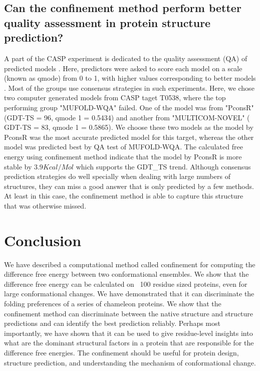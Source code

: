 \documentclass[12pt]{article}
\begin{document}
\subsection*{Can the confinement method perform better quality assessment in protein structure prediction?}

A part of the CASP experiment is dedicated to the quality assessment (QA) of predicted models \cite{Kryshtafovych2011}.
Here, predictors were asked to score each model on a scale (known as qmode) from 0 to 1, with higher values
corresponding to better models \cite{Kryshtafovych2011}. Most of the groups use consensus strategies in such experiments.
Here, we chose two computer generated models from CASP taget T0538, where the top performing group "MUFOLD-WQA" \cite{Wang2011} failed.
One of the model was from "PconsR" (GDT-TS = 96, qmode 1 = 0.5434) and another from "MULTICOM-NOVEL" ( GDT-TS = 83, qmode 1 = 0.5865). We 
choose these two models as the model by PconsR was the most accurate
predicted model for this target, whereas the other model was predicted best by QA test of MUFOLD-WQA. The calculated
free energy using confinement method indicate that the model by PconsR is more stable by $3.9
Kcal/Mol$ which supports
the GDT\_TS trend.  Although consensus prediction strategies do well specially when dealing with large numbers of structures, they 
can miss a good answer that is only predicted by a few methods. At least in this case, the confinement
method is able to capture this structure that was otherwise missed.


\section*{Conclusion}

We have described a computational method called confinement for computing the difference free energy between two
conformational ensembles. We show that the difference free energy can be calculated on ~100 residue sized proteins, even
for large conformational changes. We have demonstrated that it can discriminate the folding preferences of a series of
chameleon proteins. We show that the confinement method can discriminate between the native structure and structure
predictions and can identify the best prediction reliably. Perhaps most importantly, we have shown that it can be used
to give residue-level insights into what are the dominant structural factors in a protein that are responsible for the
difference free energies. The confinement should be useful for protein design, structure prediction, and understanding
the mechanism of conformational change.
\end{document}
